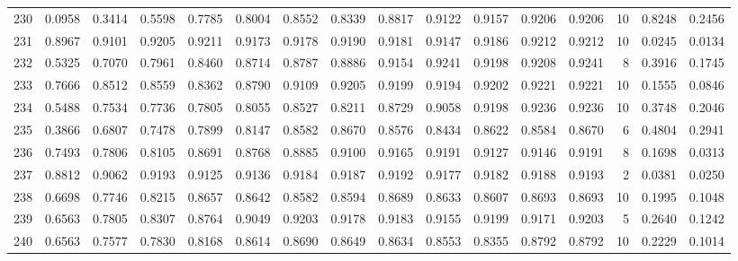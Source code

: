 \begin{tabular}{lrrrrrrrrrrrrrrr}
230 &      0.0958 &  0.3414 &  0.5598 &  0.7785 &  0.8004 &  0.8552 &  0.8339 &  0.8817 &  0.9122 &  0.9157 &   0.9206 &     0.9206 &     10 &                    0.8248 &                     0.2456 \\
231 &      0.8967 &  0.9101 &  0.9205 &  0.9211 &  0.9173 &  0.9178 &  0.9190 &  0.9181 &  0.9147 &  0.9186 &   0.9212 &     0.9212 &     10 &                    0.0245 &                     0.0134 \\
232 &      0.5325 &  0.7070 &  0.7961 &  0.8460 &  0.8714 &  0.8787 &  0.8886 &  0.9154 &  0.9241 &  0.9198 &   0.9208 &     0.9241 &      8 &                    0.3916 &                     0.1745 \\
233 &      0.7666 &  0.8512 &  0.8559 &  0.8362 &  0.8790 &  0.9109 &  0.9205 &  0.9199 &  0.9194 &  0.9202 &   0.9221 &     0.9221 &     10 &                    0.1555 &                     0.0846 \\
234 &      0.5488 &  0.7534 &  0.7736 &  0.7805 &  0.8055 &  0.8527 &  0.8211 &  0.8729 &  0.9058 &  0.9198 &   0.9236 &     0.9236 &     10 &                    0.3748 &                     0.2046 \\
235 &      0.3866 &  0.6807 &  0.7478 &  0.7899 &  0.8147 &  0.8582 &  0.8670 &  0.8576 &  0.8434 &  0.8622 &   0.8584 &     0.8670 &      6 &                    0.4804 &                     0.2941 \\
236 &      0.7493 &  0.7806 &  0.8105 &  0.8691 &  0.8768 &  0.8885 &  0.9100 &  0.9165 &  0.9191 &  0.9127 &   0.9146 &     0.9191 &      8 &                    0.1698 &                     0.0313 \\
237 &      0.8812 &  0.9062 &  0.9193 &  0.9125 &  0.9136 &  0.9184 &  0.9187 &  0.9192 &  0.9177 &  0.9182 &   0.9188 &     0.9193 &      2 &                    0.0381 &                     0.0250 \\
238 &      0.6698 &  0.7746 &  0.8215 &  0.8657 &  0.8642 &  0.8582 &  0.8594 &  0.8689 &  0.8633 &  0.8607 &   0.8693 &     0.8693 &     10 &                    0.1995 &                     0.1048 \\
239 &      0.6563 &  0.7805 &  0.8307 &  0.8764 &  0.9049 &  0.9203 &  0.9178 &  0.9183 &  0.9155 &  0.9199 &   0.9171 &     0.9203 &      5 &                    0.2640 &                     0.1242 \\
240 &      0.6563 &  0.7577 &  0.7830 &  0.8168 &  0.8614 &  0.8690 &  0.8649 &  0.8634 &  0.8553 &  0.8355 &   0.8792 &     0.8792 &     10 &                    0.2229 &                     0.1014 \\

\end{tabular}
